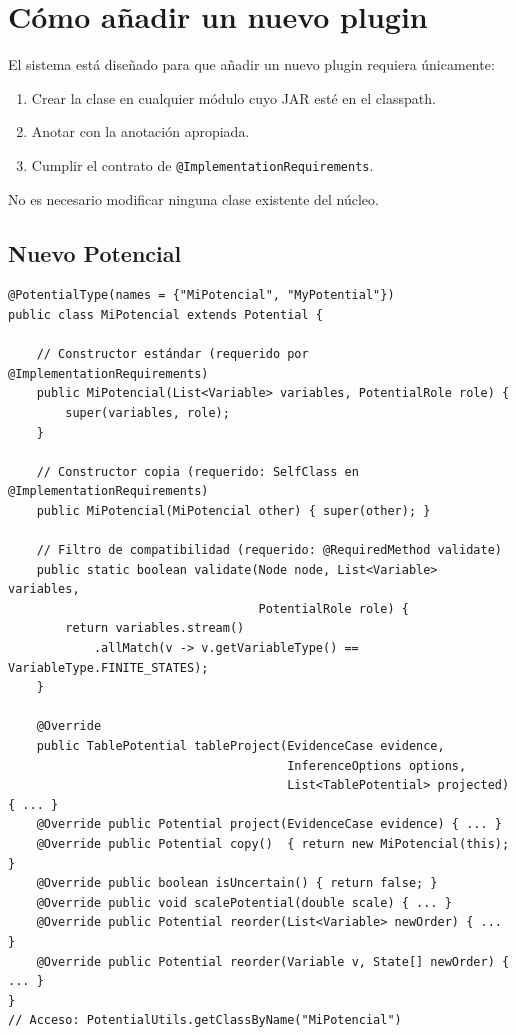 \documentclass[12pt,a4paper,spanish]{article}
\begin{document}
\section{Cómo añadir un nuevo plugin}
\label{sec:extension}

El sistema está diseñado para que añadir un nuevo plugin requiera únicamente:
\begin{enumerate}
    \item Crear la clase en cualquier módulo cuyo JAR esté en el classpath.
    \item Anotar con la anotación apropiada.
    \item Cumplir el contrato de \texttt{@ImplementationRequirements}.
\end{enumerate}
No es necesario modificar ninguna clase existente del núcleo.

\subsection{Nuevo Potencial}

\begin{lstlisting}[language=JavaPlugin, caption={Implementación de un nuevo potencial}]
@PotentialType(names = {"MiPotencial", "MyPotential"})
public class MiPotencial extends Potential {

    // Constructor estándar (requerido por @ImplementationRequirements)
    public MiPotencial(List<Variable> variables, PotentialRole role) {
        super(variables, role);
    }

    // Constructor copia (requerido: SelfClass en @ImplementationRequirements)
    public MiPotencial(MiPotencial other) { super(other); }

    // Filtro de compatibilidad (requerido: @RequiredMethod validate)
    public static boolean validate(Node node, List<Variable> variables,
                                   PotentialRole role) {
        return variables.stream()
            .allMatch(v -> v.getVariableType() == VariableType.FINITE_STATES);
    }

    @Override
    public TablePotential tableProject(EvidenceCase evidence,
                                       InferenceOptions options,
                                       List<TablePotential> projected) { ... }
    @Override public Potential project(EvidenceCase evidence) { ... }
    @Override public Potential copy()  { return new MiPotencial(this); }
    @Override public boolean isUncertain() { return false; }
    @Override public void scalePotential(double scale) { ... }
    @Override public Potential reorder(List<Variable> newOrder) { ... }
    @Override public Potential reorder(Variable v, State[] newOrder) { ... }
}
// Acceso: PotentialUtils.getClassByName("MiPotencial")
\end{lstlisting}
\end{document}
